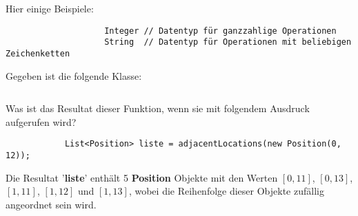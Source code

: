 \documentclass[12pt,a4paper]{exam}
\begin{document}
\begin{questions}
\begin{solution}
\begin{description}
                Hier einige Beispiele:
                \begin{verbatim}
                    Integer // Datentyp für ganzzahlige Operationen
                    String  // Datentyp für Operationen mit beliebigen Zeichenketten
                \end{verbatim}

            \end{description}
        \end{solution}
        \else\makeemptybox{\fill}
        \fi


        \newpage
        \question[10]
        Gegeben ist die folgende Klasse:
        \inputminted[autogobble,linenos,firstline=163,lastline=193]
        {java}{../java/simulation/Field.java}

        Was ist das Resultat dieser Funktion, wenn sie mit folgendem
        Ausdruck aufgerufen wird?
        \begin{verbatim}
            List<Position> liste = adjacentLocations(new Position(0, 12));
        \end{verbatim}

        \ifprintanswers
        \begin{solution}
            Die Resultat '\textbf{liste}' enthält 5 \textbf{Position}
            Objekte mit den Werten $[0,11]$, $[0,13]$, $[1,11]$, $[1,12]$ und
            $[1,13]$, wobei die Reihenfolge dieser Objekte zufällig angeordnet
            sein wird.
        \end{solution}
        \else\makeemptybox{\fill}
        \fi

    \end{questions}
\end{document}
